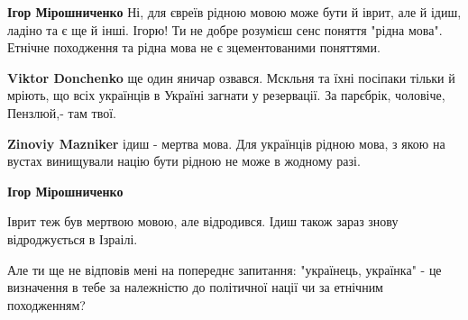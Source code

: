 \begin{itemize}
\begin{itemize}
 
\textbf{Ігор Мірошниченко} Ні, для євреїв рідною мовою може бути й іврит, але й
ідиш, ладіно та є ще й інші. Ігорю! Ти не добре розумієш сенс поняття "рідна
мова". Етнічне походження та рідна мова не є зцементованими поняттями.

 

\textbf{Viktor Donchenko} ще один яничар озвався. Мскльня та їхні посіпаки
тільки й мріють, що всіх українців в Україні загнати у резервації. За парєбрік,
чоловіче, Пензлюй,- там твої.

 

\textbf{Zinoviy Mazniker} ідиш - мертва мова. Для українців рідною мова, з якою
на вустах винищували націю бути рідною не може в жодному разі.

 
\textbf{Ігор Мірошниченко} 

Іврит теж був мертвою мовою, але відродився. Ідиш також зараз знову
відроджується в Ізраілі.

Але ти ще не відповів мені на попереднє запитання: "українець, українка" - це
визначення в тебе за належністю до політичної нації чи за етнічним походженням?

 

\end{itemize}
\end{itemize}

